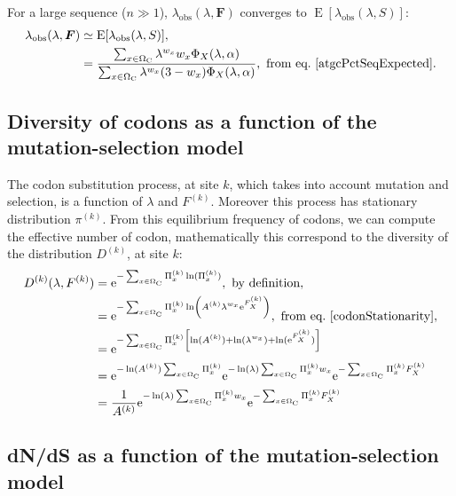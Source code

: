 For a large sequence ($ n \gg 1 $), $\lambda_{\mathrm{obs}} (\lambda, \bm{F})$ converges to $\operatorname{E} [\lambda_{\mathrm{obs}}(\lambda, S)]$:
\begin{align}
\lambda_{\mathrm{obs}} (\lambda, \bm{F})
& \simeq \operatorname{E} [\lambda_{\mathrm{obs}}(\lambda, S)],\\
& =\frac{\sum_{x \in \Omega_{\mathrm{C}}} \lambda^{w_x} w_x \Phi_X(\lambda, \alpha)}{\sum_{x \in \Omega_{\mathrm{C}}} \lambda^{w_x} (3 - w_x) \Phi_X(\lambda, \alpha)}, \ \textrm{from eq.} \ \ref{atgcPctSeqExpected}.
\end{align}


\subsection{Diversity of {codons} as a function of the mutation-selection model}


The \gls{codon} \gls{substitution} process, at site $k$, which takes into account mutation and selection, is a function of $\lambda$ and $F^{(k)}$.
Moreover this process has stationary distribution $\pi^{(k)}$.
From this equilibrium frequency of \glspl{codon}, we can compute the effective number of \gls{codon}, mathematically this correspond to the diversity of the distribution $D^{(k)}$, at site $k$:
\begin{align}
D^{(k)}(\lambda, F^{(k)})
& =\e^{ - \sum_{x \in \SetCodon}  \Pi_x^{(k)} \ln ( \Pi_x^{(k)} )}, \ \textrm{by definition},\\
& =\e^{ - \sum_{x \in \SetCodon}  \Pi_x^{(k)} \ln \left( A^{(k)} \lambda^{w_x} \e^{F_X^{(k)}} \right)}, \ \textrm{from eq.} \ \ref{codonStationarity},\\
& =\e^{ - \sum_{x \in \SetCodon}  \Pi_x^{(k)} \left[ \ln ( A^{(k)} )+ \ln( \lambda^{w_x} ) + \ln (\e^{F_X^{(k)}}) \right] }\\
& =\e^{ - \ln ( A^{(k)} ) \sum_{x \in \SetCodon}  \Pi_x^{(k)} } \e^{ -  \ln (\lambda) \sum_{x \in \SetCodon}  \Pi_x^{(k)} w_x }\e^{ - \sum_{x \in \SetCodon}  \Pi_x^{(k)} F_X^{(k)}  } \\
& =\frac{1}{A^{(k)}} \e^{ -  \ln (\lambda) \sum_{x \in \SetCodon}  \Pi_x^{(k)} w_x }\e^{ - \sum_{x \in \SetCodon}  \Pi_x^{(k)} F_X^{(k)}  }
\label{entropy}
\end{align}

\subsection{dN/dS as a function of the mutation-selection model}

